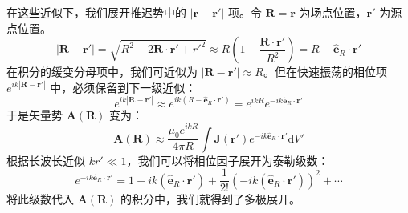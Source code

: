 \documentclass[fontset=none]{ctexart}
\begin{document}
在这些近似下，我们展开推迟势中的 $|\bm{r}-\bm{r}'|$ 项。令 $\bm{R}=\bm{r}$ 为场点位置，$\bm{r}'$ 为源点位置。
\begin{equation}
    |\bm{R}-\bm{r}'| = \sqrt{R^2 - 2\bm{R}\cdot\bm{r}' + r'^2} \approx R\left(1 - \frac{\bm{R}\cdot\bm{r}'}{R^2}\right) = R - \bm{\hat{e}}_R \cdot \bm{r}'
\end{equation}
在积分的缓变分母项中，我们可近似为 $|\bm{R}-\bm{r}'| \approx R$。但在快速振荡的相位项 $e^{ik|\bm{R}-\bm{r}'|}$ 中，必须保留到下一级近似：
\begin{equation}
    e^{ik|\bm{R}-\bm{r}'|} \approx e^{ik(R - \bm{\hat{e}}_R \cdot \bm{r}')} = e^{ikR}e^{-ik\bm{\hat{e}}_R \cdot \bm{r}'}
\end{equation}
于是矢量势 $\bm{A}(\bm{R})$ 变为：
\begin{equation}
    \bm{A}(\bm{R}) \approx \frac{\mu_0 e^{ikR}}{4\pi R} \int \bm{J}(\bm{r}') e^{-ik\bm{\hat{e}}_R \cdot \bm{r}'} \mathrm{d}V'
\end{equation}
根据长波长近似 $kr' \ll 1$，我们可以将相位因子展开为泰勒级数：
\begin{equation}
    e^{-ik\bm{\hat{e}}_R \cdot \bm{r}'} = 1 - i k(\bm{\hat{e}}_R \cdot \bm{r}') + \frac{1}{2!}(-ik(\bm{\hat{e}}_R \cdot \bm{r}'))^2 + \cdots
\end{equation}
将此级数代入 $\bm{A}(\bm{R})$ 的积分中，我们就得到了多极展开。
\end{document}
